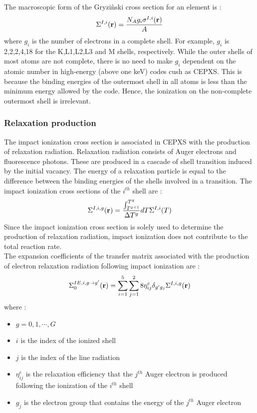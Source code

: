 The macroscopic form of the Gryzi\`nski cross section for an element is :
\begin{equation}
\Sigma^{I,i}(\mathbf{r}) = \frac{N_A g_i \sigma^{I,i}(\mathbf{r})}{A}
\end{equation}
where $g_i$ is the number of electrons in a complete shell. For example, $g_i$
is 2,2,2,4,18 for the K,L1,L2,L3 and M shells, respectively. While the outer
shells of most atoms are not complete, there is no need to make $g_i$
dependent on the atomic number in high-energy (above one keV) codes cush as
CEPXS. This is because the binding energies of the outermost shell in all
atoms is less than the minimum energy allowed by the code. Hence, the
ionization on the non-complete outermost shell is irrelevant.

\subsubsection{Relaxation production}
The impact ionization cross section is associated in CEPXS with the production
of relaxation radiation. Relaxation radiation consists of Auger electrons and
fluorescence photons. These are produced in a cascade of shell transition
induced by the initial vacancy. The energy of a relaxation particle is equal
to the difference between the binding energies of the shells involved in a
transition. The impact ionization cross sections of the $i^{th}$ shell are :
\begin{equation}
\Sigma^{I,i,g}(\mathbf{r}) = \frac{\int_{T^{g+1}}^{T^g}}{\Delta T^g} dT
\Sigma^{I,i}(T)
\end{equation}
Since the impact ionization cross section is solely used to determine the
production of relaxation radiation, impact ionization does not contribute to
the total reaction rate.\\
The expansion coefficients of the transfer matrix associated with the
production of electron relaxation radiation following impact ionization are :
\begin{equation}
\Sigma_0^{IE,i,g\rightarrow g'}(\mathbf{r}) = \sum_{i=1}^5 \sum_{j=1}^28 \eta_{ij}^e
\delta_{g' g_j}\Sigma^{I,i,g}(\mathbf{r})
\end{equation}
where :
\begin{itemize}
\item $g=0,1,\cdots,G$           
\item $i$ is the index of the ionized shell
\item $j$ is the index of the line radiation
\item $\eta_{ij}^e$ is the relaxation efficiency that the $j^{th}$ Auger
electron is produced following the ionization of the $i^{th}$ shell
\item $g_j$ is the electron group that contains the energy of the $j^{th}$
Auger electron
\end{itemize}
